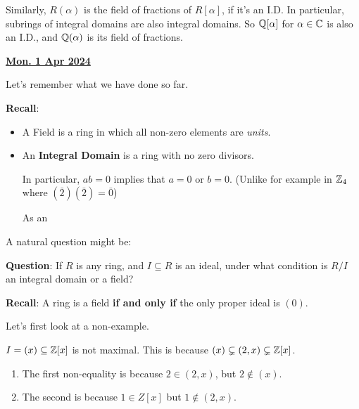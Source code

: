 \documentclass[12pt]{article}
\renewcommand{\date}[1]{\underline{\bf #1}}
\begin{document}
Similarly, $R(\alpha)$ is the field of fractions of $R[\alpha]$, if it's an I.D.
In particular, subrings of integral domains are also integral domains. So
${\mathbb Q}[\alpha]$ for $\alpha \in {\mathbb C}$ is also an I.D., and ${\mathbb Q}(\alpha)$ is its field
of fractions.

\date{Mon. 1 Apr 2024}

Let's remember what we have done so far.

{\bf Recall}: 
\begin{itemize}
  \item A Field is a ring in which all non-zero elements are {\it units}.
  \item An {\bf Integral Domain} is a ring with no zero divisors. 

    In particular, $ab = 0$ implies that $a = 0$ or $b = 0$. (Unlike for example
    in ${\mathbb Z}_4$ where $(\bar 2)(\bar 2) = \bar 0$)

    As an

\end{itemize}

A natural question might be:

{\bf Question}: If $R$ is any ring, and $I \subseteq R$ is an ideal, under what
condition is $R / I$ an integral domain or a field?

{\bf Recall}: A ring is a field {\bf if and only if} the only proper ideal is
$(0)$.


Let's first look at a non-example.

$I = (x) \subseteq {\mathbb Z}[x]$ is not maximal. This is because $(x) \subsetneq (2, x)
\subsetneq {\mathbb Z}[x]$.

\begin{enumerate}
  \item The first non-equality is because $2 \in (2, x)$, but $2 \not\in (x)$.
  \item The second is because $1 \in Z[x]$ but $1 \not\in (2, x)$.
\end{enumerate}
\end{document}
